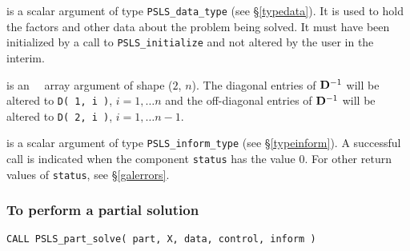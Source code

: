 \documentclass{galahad}
\newcommand{\packagename}{PSLS}
\begin{document}
\begin{description}

 is a scalar \intentinout argument of type
{\tt \packagename\_data\_type}
(see \S\ref{typedata}). It is used to hold the factors and other
data about the problem being solved.
It must have been initialized by a call to
{\tt \packagename\_ini\-tialize} and not altered by the user in the interim.

 is an \intentinout\ \realdp\ array argument of shape ($2$, $n$).
The diagonal entries of ${\mathbf{D}}^{-1} $ will
be altered to {\tt D( 1, i )}, $i = 1, \ldots n$ and the off-diagonal
entries of ${\mathbf{D}}^{-1} $ will be altered to {\tt D( 2, i )},
$i = 1, \ldots n-1$.

 is a scalar \intentinout argument of type
{\tt \packagename\_inform\_type}
(see \S\ref{typeinform}).
A successful call is indicated when the  component {\tt status} has the value 0.
For other return values of {\tt status}, see \S\ref{galerrors}.

\end{description}

\subsubsection{To perform a partial solution}

\hskip0.5in
{\tt CALL \packagename\_part\_solve( part, X, data, control, inform )}
\end{document}
